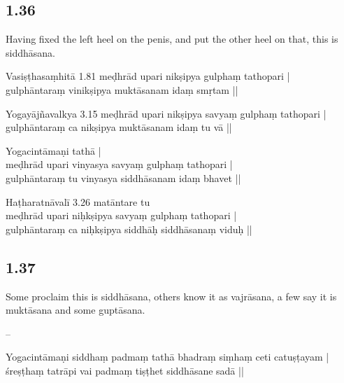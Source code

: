 \begin{ekdosis}
\subsection*{1.36}
\begin{translation}[hp01_036]
Having fixed the left heel on the penis, and put the other heel on that, this is siddhāsana.
\end{translation}

\begin{sources}[hp01_036]
Vasiṣṭhasaṃhitā 1.81
\startverse
meḍhrād upari nikṣipya gulphaṃ tathopari |\\
gulphāntaraṃ vinikṣipya muktāsanam idaṃ smṛtam ||
\endverse

Yogayājñavalkya 3.15
\startverse
meḍhrād upari nikṣipya savyaṃ gulphaṃ tathopari |\\
gulphāntaraṃ ca nikṣipya muktāsanam idaṃ tu vā ||
\endverse
\end{sources}

\begin{testimonia}[hp01_036]
Yogacintāmaṇi
\startverse
tathā |\\
meḍhrād upari vinyasya savyaṃ gulphaṃ tathopari |\\
gulphāntaraṃ tu vinyasya siddhāsanam idaṃ bhavet ||
\endverse

Haṭharatnāvalī 3.26
\startverse
matāntare tu\\
meḍhrād upari niḥkṣipya savyaṃ gulphaṃ tathopari |\\
gulphāntaraṃ ca niḥkṣipya siddhāḥ siddhāsanaṃ viduḥ ||
\endverse
\end{testimonia}

\subsection*{1.37}
\begin{translation}[hp01_037]
Some proclaim this is siddhāsana, others know it as vajrāsana, a few say it is muktāsana and some guptāsana.
\end{translation}

\begin{sources}[hp01_037]
--
\end{sources}

\begin{testimonia}[hp01_037]
Yogacintāmaṇi
\startverse
siddhaṃ padmaṃ tathā bhadraṃ siṃhaṃ ceti catuṣṭayam |\\
śreṣṭhaṃ tatrāpi vai padmaṃ tiṣṭhet siddhāsane sadā ||
\endverse


\end{testimonia}
\end{ekdosis}
